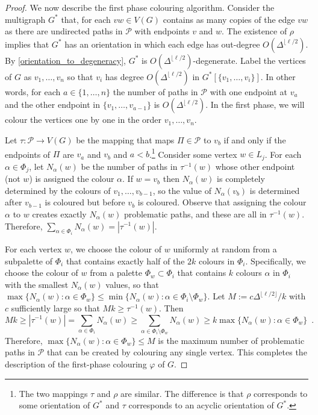 \documentclass{patmorin}
\begin{document}
\begin{proof}
  We now describe the first phase colouring algorithm.  Consider the multigraph $G^*$ that, for each $vw\in V(G)$ contains as many copies of the edge $vw$ as there are undirected paths in $\mathcal{P}$ with endpoints $v$ and $w$.  The existence of $\rho$ implies that $G^*$ has an orientation in which each edge has out-degree $O(\Delta^{\lfloor\ell /2})$.  By \cref{orientation_to_degeneracy}, $G^*$ is $O(\Delta^{\lfloor\ell /2})$-degenerate.  Label the vertices of $G$ as $v_1,\ldots,v_n$ so that $v_i$ has degree $O(\Delta^{\lfloor\ell /2})$ in $G^*[\{v_1,\ldots,v_{i}\}]$. In other words, for each $a\in\{1,\ldots,n\}$ the number of paths in $\mathcal{P}$ with one endpoint at $v_a$ and the other endpoint in $\{v_1,\ldots,v_{a-1}\}$ is $O(\Delta^{\lfloor\ell /2})$.  In the first phase, we will colour the vertices one by one in the order $v_1,\ldots,v_n$.

  Let $\tau:\mathcal{P}\to V(G)$ be the mapping that maps $\Pi\in\mathcal{P}$ to $v_b$ if and only if the endpoints of $\Pi$ are $v_a$ and $v_b$ and $a < b$.\footnote{The two mappings $\tau$ and $\rho$ are similar. The difference is that $\rho$ corresponds to some orientation of $G^*$ and $\tau$ corresponds to an acyclic orientation of $G^*$.}  Consider some vertex $w\in L_j$.  For each $\alpha \in \Phi_j$, let $N_{\alpha}(w)$ be the number of paths in $\tau^{-1}(w)$ whose other endpoint (not $w$) is assigned the colour $\alpha$. If $w=v_b$ then $N_{\alpha}(w)$ is completely determined by the colours of $v_1,\ldots,v_{b-1}$, so the value of $N_\alpha(v_b)$ is determined after $v_{b-1}$ is coloured but before $v_b$ is coloured.  Observe that assigning the colour $\alpha$ to $w$ creates exactly $N_{\alpha}(w)$ problematic paths, and these are all in $\tau^{-1}(w)$.  Therefore, $\sum_{\alpha\in\Phi_i} N_\alpha(w)=|\tau^{-1}(w)|$.

  For each vertex $w$, we choose the colour of $w$ uniformly at random from a subpalette of $\Phi_i$ that contains exactly half of the $2k$ colours in $\Phi_i$.  Specifically, we choose the colour of $w$ from a palette $\Phi_w\subset \Phi_i$ that contains $k$ colours $\alpha$ in $\Phi_i$ with the smallest $N_\alpha(w)$ values, so that  $\max\{N_\alpha(w):\alpha\in \Phi_w\}\le\min\{N_\alpha(w):\alpha\in\Phi_i\setminus\Phi_w\}$.  Let $M:=c\Delta^{\lfloor\ell/2\rfloor}/k$ with $c$ sufficiently large so that $Mk\ge \tau^{-1}(w)$.
  Then
  \[
    Mk \ge |\tau^{-1}(w)|= \sum_{\alpha\in \Phi_i} N_\alpha(w) \ge \sum_{\alpha\in\Phi_i\setminus\Phi_w}N_\alpha(w) \ge k\max\{N_\alpha(w):\alpha\in \Phi_w\} \enspace .
  \]
  Therefore, $\max\{N_\alpha(w):\alpha\in \Phi_w\}\le M$ is the maximum number of problematic paths in $\mathcal{P}$ that can be created by colouring any single vertex.  This completes the description of the first-phase colouring $\varphi$ of $G$.



\end{proof}
\end{document}
